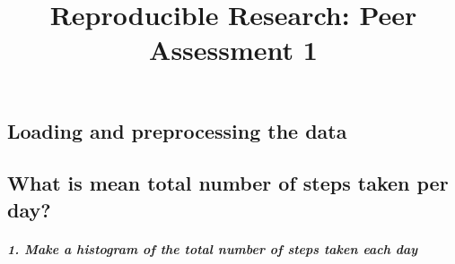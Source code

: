 \documentclass[
]{article}
\title{Reproducible Research: Peer Assessment 1}
\author{}
\date{\vspace{-2.5em}}
\newenvironment{Shaded}{\begin{snugshade}}{\end{snugshade}}
\newcommand{\AttributeTok}[1]{\textcolor[rgb]{0.77,0.63,0.00}{#1}}
\newcommand{\ConstantTok}[1]{\textcolor[rgb]{0.00,0.00,0.00}{#1}}
\newcommand{\ControlFlowTok}[1]{\textcolor[rgb]{0.13,0.29,0.53}{\textbf{#1}}}
\newcommand{\FunctionTok}[1]{\textcolor[rgb]{0.00,0.00,0.00}{#1}}
\newcommand{\NormalTok}[1]{#1}
\newcommand{\OtherTok}[1]{\textcolor[rgb]{0.56,0.35,0.01}{#1}}
\newcommand{\SpecialCharTok}[1]{\textcolor[rgb]{0.00,0.00,0.00}{#1}}
\newcommand{\StringTok}[1]{\textcolor[rgb]{0.31,0.60,0.02}{#1}}
\begin{document}
\maketitle

\hypertarget{loading-and-preprocessing-the-data}{%
\subsection{Loading and preprocessing the
data}\label{loading-and-preprocessing-the-data}}

\begin{Shaded}
\end{Shaded}

\hypertarget{what-is-mean-total-number-of-steps-taken-per-day}{%
\subsection{What is mean total number of steps taken per
day?}\label{what-is-mean-total-number-of-steps-taken-per-day}}

\begin{Shaded}
\end{Shaded}

\hypertarget{make-a-histogram-of-the-total-number-of-steps-taken-each-day}{%
\subparagraph{1. Make a histogram of the total number of steps taken
each
day}\label{make-a-histogram-of-the-total-number-of-steps-taken-each-day}}
\end{document}
